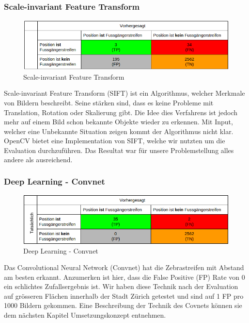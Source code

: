 \subsubsection{Scale-invariant Feature Transform}	
\begin{figure}[H]
\includegraphics[width=\textwidth]{images/sif_conf.png}
\caption[Scale-invariant Feature Transform]{Scale-invariant Feature Transform}
\end{figure}
Scale-invariant Feature Transform (SIFT) ist ein Algorithmus, welcher Merkmale von Bildern beschreibt. Seine stärken sind, dass es keine Probleme mit Translation, Rotation oder Skalierung gibt. Die Idee dies Verfahrens ist jedoch mehr auf einem Bild schon bekannte Objekte wieder zu erkennen. Mit Input, welcher eine Unbekannte Situation zeigen kommt der Algorithmus nicht klar.\\
OpenCV bietet eine Implementation von SIFT, welche wir nutzten um die Evaluation durchzuführen. Das Resultat war für unsere Problemstellung alles andere als ausreichend.
\subsubsection{Deep Learning - Convnet}	
\begin{figure}[H]
\includegraphics[width=\textwidth]{images/deep_conf.png}
\caption[Deep Learning]{Deep Learning - Convnet}
\end{figure}
Das Convolutional Neural Network (Convnet) hat die Zebrastreifen mit Abstand am besten erkannt. Anzumerken ist hier, dass die False Positive (FP) Rate von 0 ein schlichtes Zufallsergebnis ist. Wir haben diese Technik nach der Evaluation auf grösseren Flächen innerhalb der Stadt Zürich getestet und sind auf 1 FP pro 1000 Bildern gekommen. Eine Beschreibung der Technik des Covnets können sie dem nächsten Kapitel Umsetzungskonzept entnehmen.

